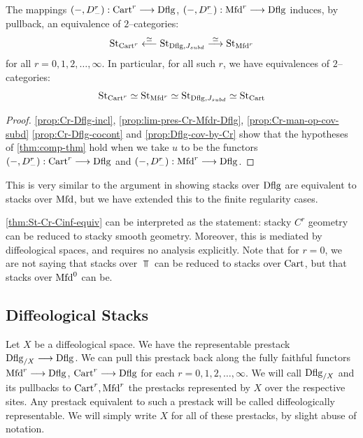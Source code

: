 \documentclass[11pt]{amsart}
\begin{document}
\begin{thm}\label{thm:St-Cr-Cinf-equiv}
The mappings $(-, D^r_{-}) : \Cart^r \to \Dflg$, $(-, D^r_{-}) : \Mfd^r \to \Dflg$
induces, by pullback, an equivalence of $2$--categories:
\[
\St_{\Cart^r} \ot[\simeq] \St_{\Dflg, J_{subd}} \to[\simeq] \St_{\Mfd^r}
\]
for all $r = 0, 1, 2, \dots, \infty$.
In particular, for all such $r$, we have equivalences of $2$--categories:
\[
\mathrm{St}_{\mathrm{Cart}^r} \simeq \mathrm{St}_{\mathrm{Mfd}^r} \simeq \mathrm{St}_{\mathrm{Dflg}, J_{subd}} \simeq \mathrm{St}_{\mathrm{Cart}}
\]
\end{thm}
\begin{proof}
\cref{prop:Cr-Dflg-incl}, \cref{prop:lim-pres-Cr-Mfdr-Dflg}, \cref{prop:Cr-man-op-cov-subd}
\cref{prop:Cr-Dflg-cocont} and \cref{prop:Dflg-cov-by-Cr} show that the hypotheses
of \cref{thm:comp-thm} hold when we take $u$ to be the functors
$(-, D^r_{-}) : \Cart^r \to \Dflg$ and $(-, D^r_{-}) : \Mfd^r \to \Dflg$.
\end{proof}

\begin{rmk}
This is very similar to the argument in \cite{CarchediComparison} showing stacks over
$\mathrm{Dflg}$ are equivalent to stacks over $\mathrm{Mfd}$, but we have extended this to the finite regularity
cases.
\end{rmk}

\begin{rmk}
\cref{thm:St-Cr-Cinf-equiv} can be interpreted as the statement: stacky $C^r$ geometry
can be reduced to stacky smooth geometry. Moreover, this is mediated by diffeological spaces,
and requires no analysis explicitly. Note that for $r = 0$, we are not saying that stacks over
$\Top$ can be reduced to stacks over $\mathrm{Cart}$, but that stacks over $\mathrm{Mfd}^0$ can be.
\end{rmk}

\subsection{Diffeological Stacks}
\label{subsec:dflg-st}

\begin{defn}
Let $X$ be a diffeological space. We have the representable prestack $\Dflg_{/X} \to \Dflg$.
We can pull this prestack back along the fully faithful functors $\Mfd^r \to \Dflg$,
$\Cart^r \to \Dflg$ for each $r = 0, 1, 2, \dots, \infty$.
We will call $\mathrm{Dflg}_{/X}$ and its pullbacks to $\mathrm{Cart}^r, \mathrm{Mfd}^r$ the prestacks represented by $X$
over the respective sites. Any prestack equivalent to such a prestack will be called diffeologically
representable.
We will simply write $X$ for all of these prestacks, by slight abuse of notation.
\end{defn}
\end{document}
